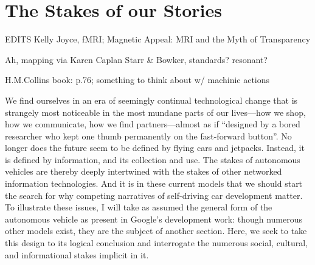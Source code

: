 \chapter{The Stakes of our Stories}
\label{chap:3}










EDITS
Kelly Joyce, fMRI; Magnetic Appeal: MRI and the Myth of Transparency

Ah, mapping via Karen Caplan
Starr & Bowker, standards? resonant?

H.M.Collins book: p.76; something to think about w/ machinic actions


We find ourselves in an era of seemingly continual technological
change that is strangely most noticeable in the most mundane parts of
our lives---how we shop, how we communicate, how we find
partners---almost as if ``designed by a bored researcher who kept one
thumb permanently on the fast-forward button''\cite[p.
  7]{Neuromancer1984}. No longer does the future seem to be
defined by flying cars and jetpacks. Instead, it is defined by
information, and its collection and use. The stakes of autonomous
vehicles are thereby deeply intertwined with the
stakes of other networked information technologies. And it is in these
current models that we should start the search for why competing
narratives of self-driving car development matter. To illustrate these
issues, I will
take as assumed the general form of the autonomous vehicle as present
in Google's development work: though numerous other models exist, they
are the subject of another section. Here, we seek to take this design
to its logical conclusion and interrogate the numerous social,
cultural, and informational stakes implicit in it.


